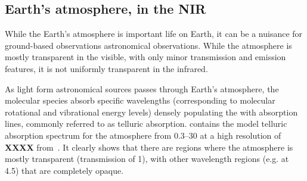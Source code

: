 

\subsection{Earth's atmosphere, in the NIR}
While the Earth's atmosphere is important life on Earth, it can be a nuisance for ground-based observations astronomical observations. While the atmosphere is mostly transparent in the visible, with only minor transmission and emission features, it is not uniformly transparent in the infrared. 

As light form astronomical sources passes through Earth's atmosphere, the molecular species absorb specific wavelengths (corresponding to molecular rotational and vibrational energy levels) densely populating the \nir{} with absorption lines, commonly referred to as telluric absorption.  contains the model telluric absorption spectrum for the atmosphere from 0.3--30\um{} at a high resolution of \textbf{XXXX} from~\citet{smette_molecfit_2015}. It clearly shows that there are regions where the atmosphere is mostly transparent (transmission of 1), with other wavelength regions (e.g. at 4.5\um) that are completely opaque.

